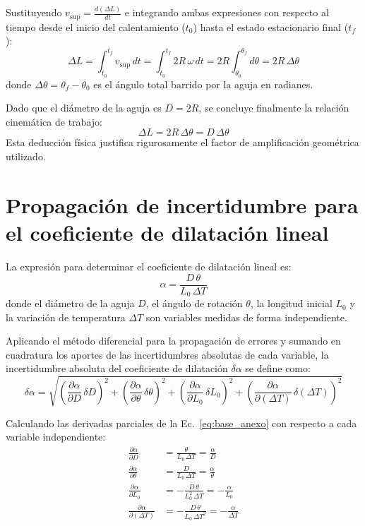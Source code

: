 \begin{appendices}
Sustituyendo $v_{\text{sup}} = \frac{d(\Delta L)}{dt}$ e integrando ambas expresiones con respecto al tiempo desde el inicio del calentamiento ($t_0$) hasta el estado estacionario final ($t_f$):
\begin{equation}
    \Delta L = \int_{t_0}^{t_f} v_{\text{sup}}\,dt = \int_{t_0}^{t_f} 2R\,\omega\,dt = 2R \int_{\theta_0}^{\theta_f} d\theta = 2R\,\Delta\theta
\end{equation}
donde $\Delta\theta = \theta_f - \theta_0$ es el ángulo total barrido por la aguja en radianes.

Dado que el diámetro de la aguja es $D = 2R$, se concluye finalmente la relación cinemática de trabajo:
\begin{equation*}
    \Delta L = 2R\,\Delta\theta = D\,\Delta\theta
\end{equation*}
Esta deducción física justifica rigurosamente el factor de amplificación geométrica utilizado.

\section{Propagación de incertidumbre para el coeficiente de dilatación lineal}
\label{sec:anexo_propagacion}

La expresión para determinar el coeficiente de dilatación lineal es:
\begin{equation}
    \alpha = \frac{D\,\theta}{L_0\,\Delta T}
    \label{eq:base_anexo}
\end{equation}
donde el diámetro de la aguja $D$, el ángulo de rotación $\theta$, la longitud inicial $L_0$ y la variación de temperatura $\Delta T$ son variables medidas de forma independiente.

Aplicando el método diferencial para la propagación de errores y sumando en cuadratura los aportes de las incertidumbres absolutas de cada variable, la incertidumbre absoluta del coeficiente de dilatación $\delta\alpha$ se define como:
\begin{equation}
    \delta\alpha = \sqrt{
        \left( \frac{\partial\alpha}{\partial D}\,\delta D \right)^2 +
        \left( \frac{\partial\alpha}{\partial \theta}\,\delta\theta \right)^2 +
        \left( \frac{\partial\alpha}{\partial L_0}\,\delta L_0 \right)^2 +
        \left( \frac{\partial\alpha}{\partial (\Delta T)}\,\delta(\Delta T) \right)^2
    }
    \label{eq:cuadratura_derivadas}
\end{equation}

Calculando las derivadas parciales de la Ec.~\eqref{eq:base_anexo} con respecto a cada variable independiente:
\begin{align}
    \frac{\partial\alpha}{\partial D} &= \frac{\theta}{L_0\,\Delta T} = \frac{\alpha}{D} \\
    \frac{\partial\alpha}{\partial \theta} &= \frac{D}{L_0\,\Delta T} = \frac{\alpha}{\theta} \\
    \frac{\partial\alpha}{\partial L_0} &= -\frac{D\,\theta}{L_0^2\,\Delta T} = -\frac{\alpha}{L_0} \\
    \frac{\partial\alpha}{\partial (\Delta T)} &= -\frac{D\,\theta}{L_0\,\Delta T^2} = -\frac{\alpha}{\Delta T}
\end{align}


\end{appendices}
